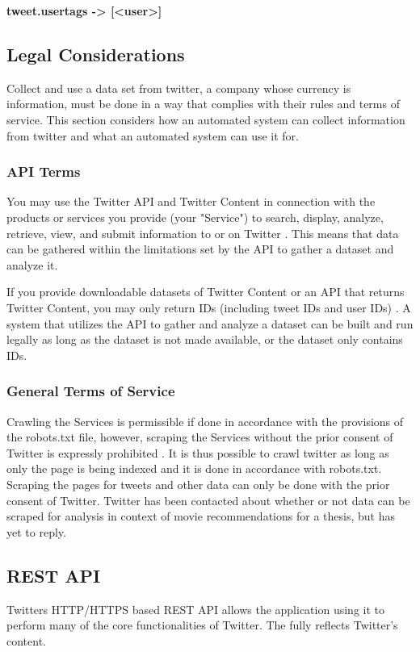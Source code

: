 \textbf{tweet.usertags -> [<user>]}

\subsection{Legal Considerations}
Collect and use a data set from twitter, a company whose currency is information, must be done in a way that complies with their rules and terms of service. This section considers how an automated system can collect information from twitter and what an automated system can use it for.

\subsubsection{API Terms}
You may use the Twitter API and Twitter Content in connection with the products or services you provide (your "Service") to search, display, analyze, retrieve, view, and submit information to or on Twitter \cite{twitter-api-terms}. This means that data can be gathered within the limitations set by the API to gather a dataset and analyze it.

If you provide downloadable datasets of Twitter Content or an API that returns Twitter Content, you may only return IDs (including tweet IDs and user IDs) \cite{twitter-api-terms}. A system that utilizes the API to gather and analyze a dataset can be built and run legally as long as the dataset is not made available, or the dataset only contains IDs.

\subsubsection{General Terms of Service}
Crawling the Services is permissible if done in accordance with the provisions of the robots.txt \cite{twitter-robots-txt} file, however, scraping the Services without the prior consent of Twitter is expressly prohibited \cite{twitter-tos}. It is thus possible to crawl twitter as long as only the page is being indexed and it is done in accordance with robots.txt. Scraping the pages for tweets and other data can only be done with the prior consent of Twitter. Twitter has been contacted about whether or not data can be scraped for analysis in context of movie recommendations for a thesis, but has yet to reply.


\subsection{REST API}
Twitters HTTP/HTTPS based REST API allows the application using it to perform many of the core functionalities of Twitter. The fully reflects Twitter's content.

